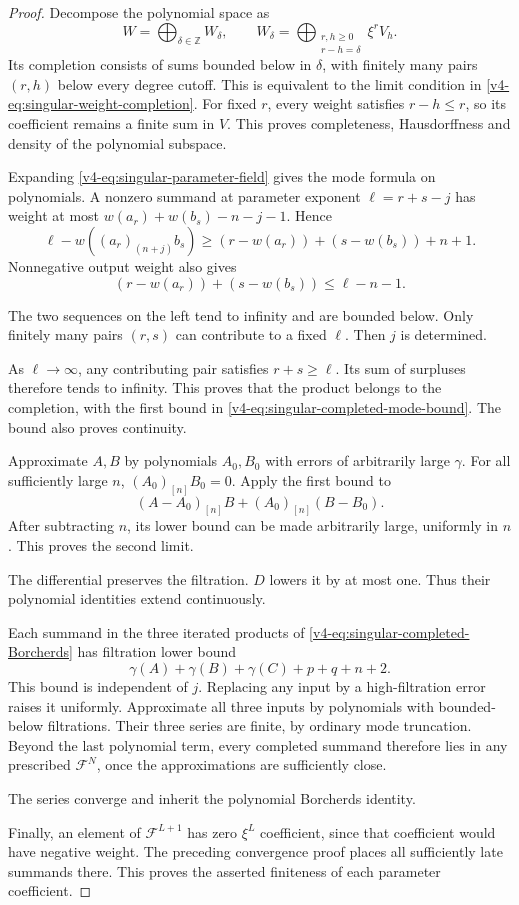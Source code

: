 \begin{proof}
Decompose the polynomial space as
\[
 W=\bigoplus_{\delta\in\mathbb Z}W_\delta,\qquad
 W_\delta=\bigoplus_{\substack{r,h\geq0\\r-h=\delta}}\xi^rV_h.
\]
Its completion consists of sums bounded
below in \(\delta\), with finitely many
pairs \((r,h)\) below every degree cutoff.
This is equivalent to the limit condition
in \eqref{v4-eq:singular-weight-completion}.
For fixed \(r\), every weight satisfies
\(r-h\leq r\), so its coefficient remains
a finite sum in \(V\).
This proves completeness, Hausdorffness
and density of the polynomial subspace.

Expanding \eqref{v4-eq:singular-parameter-field}
gives the mode formula on polynomials.
A nonzero summand at parameter exponent
\(\ell=r+s-j\) has weight at most
\(w(a_r)+w(b_s)-n-j-1\). Hence
\begin{equation}\label{v4-eq:singular-mode-surplus}
 \ell-w((a_r)_{(n+j)}b_s)
       \geq(r-w(a_r))+(s-w(b_s))+n+1.
\end{equation}
Nonnegative output weight also gives
\[
              (r-w(a_r))+(s-w(b_s))\leq\ell-n-1.
\]

The two sequences on the left tend
to infinity and are bounded below.
Only finitely many pairs \((r,s)\)
can contribute to a fixed \(\ell\).
Then \(j\) is determined.

As \(\ell\to\infty\), any contributing
pair satisfies \(r+s\geq\ell\).
Its sum of surpluses therefore tends
to infinity. This proves that the
product belongs to the completion,
with the first bound in
\eqref{v4-eq:singular-completed-mode-bound}.
The bound also proves continuity.

Approximate \(A,B\) by polynomials \(A_0,B_0\)
with errors of arbitrarily large \(\gamma\).
For all sufficiently large \(n\),
\((A_0)_{[n]}B_0=0\).
Apply the first bound to
\[
           (A-A_0)_{[n]}B+(A_0)_{[n]}(B-B_0).
\]
After subtracting \(n\), its lower
bound can be made arbitrarily large,
uniformly in \(n\). This proves the
second limit.

The differential preserves
the filtration. \(D\) lowers it by at most one.
Thus their polynomial identities extend continuously.

Each summand in the three iterated
products of \eqref{v4-eq:singular-completed-Borcherds}
has filtration lower bound
\[
                       \gamma(A)+\gamma(B)+\gamma(C)+p+q+n+2.
\]
This bound is independent of \(j\).
Replacing any input by a high-filtration
error raises it uniformly.
Approximate all three inputs by polynomials
with bounded-below filtrations.
Their three series are finite, by
ordinary mode truncation.
Beyond the last polynomial term, every
completed summand therefore lies in any
prescribed \(\mathcal F^N\), once the
approximations are sufficiently close.

The series converge and inherit the
polynomial Borcherds identity.

Finally, an element of \(\mathcal F^{L+1}\)
has zero \(\xi^L\) coefficient, since
that coefficient would have negative weight.
The preceding convergence proof places
all sufficiently late summands there.
This proves the asserted finiteness
of each parameter coefficient.
\end{proof}

